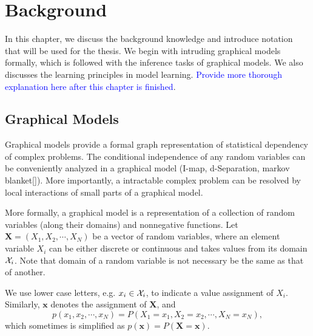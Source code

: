 \chapter{Background}
\label{chapter2}
In this chapter, we discuss the background knowledge and introduce notation that will be used for the thesis. We begin with intruding graphical models formally, which is followed with the inference tasks of graphical models. We also discusses the learning principles in model learning. \textcolor{blue}{Provide more thorough explanation here after this chapter is finished}.

\section{Graphical Models}
Graphical models provide a formal graph representation of statistical dependency of complex problems. The conditional independence of any random variables can be conveniently analyzed in a graphical model (I-map, d-Separation, markov blanket[]). More importantly, a intractable complex problem can be resolved by local interactions of small parts of a graphical model.

More formally, a graphical model is a representation of a collection of random variables (along their domains) and nonnegative functions. Let $\bm{X}= (X_1, X_2, \cdots, X_N)$ be a vector of random variables, where an element variable $X_i$ can be either discrete or continuous and takes values from its domain $\mathcal{X}_i$. Note that domain of a random variable is not necessary be the same as that of another.

We use lower case letters, e.g. $x_i \in \mathcal{X}_i$, to indicate a value assignment of $X_i$. Similarly, $\bm{x}$ denotes the assignment of $\bm{X}$, and
\begin{equation}
  p(x_1, x_2, \cdots, x_N) = P(X_1 = x_1, X_2 = x_2, \cdots, X_N = x_N),
\end{equation}
which sometimes is simplified as $p(\bm{x})=P(\bm{X}=\bm{x})$.

